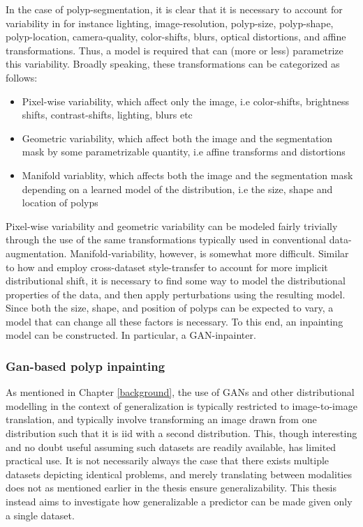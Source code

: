   	In the case of polyp-segmentation, it is clear that it is necessary to account for variability in for instance lighting, image-resolution, polyp-size, polyp-shape, polyp-location, camera-quality, color-shifts, blurs, optical distortions, and affine transformations. Thus, a model is required that can (more or less) parametrize this variability. Broadly speaking, these transformations can be categorized as follows:
    \begin{itemize}
        \item Pixel-wise variability, which affect only the image, i.e color-shifts, brightness shifts, contrast-shifts, lighting, blurs etc
        \item Geometric variability, which affect both the image and the segmentation mask by some parametrizable quantity, i.e affine transforms and distortions
        \item Manifold variablity, which affects both the image and the segmentation mask depending on a learned model of the distribution,  i.e the size, shape and location of polyps
    \end{itemize}
    Pixel-wise variability and geometric variability can be modeled fairly trivially through the use of the same transformations typically used in conventional data-augmentation. Manifold-variability, however, is somewhat more difficult. Similar to how \cite{modelbased} and \cite{cyclegan} employ cross-dataset style-transfer to account for more implicit distributional shift, it is necessary to find some way to model the distributional properties of the data, and then apply perturbations using the resulting model. Since both the size, shape, and position of polyps can be expected to vary, a model that can change all these factors is necessary. To this end, an inpainting model can be constructed. In particular, a GAN-inpainter. 
    \subsubsection{Gan-based polyp inpainting}
    As mentioned in Chapter \ref{background}, the use of GANs and other distributional modelling in the context of generalization is typically restricted to image-to-image translation, and typically involve transforming an image drawn from one distribution such that it is iid with a second distribution. This, though interesting and no doubt useful assuming such datasets are readily available, has limited practical use. It is not necessarily always the case that there exists multiple datasets depicting identical problems, and merely translating between modalities does not as mentioned earlier in the thesis ensure generalizability. This thesis instead aims to investigate how generalizable a predictor can be made given only a single dataset. %
